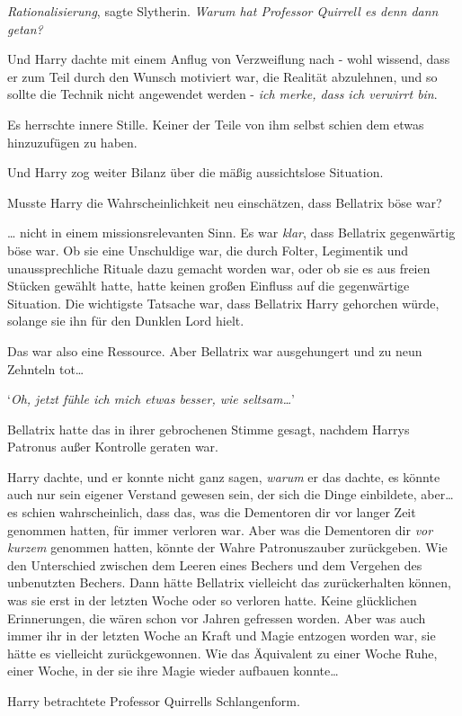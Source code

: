 {\emph{Rationalisierung}, sagte Slytherin. \emph{Warum hat Professor Quirrell es denn dann getan?}

Und Harry dachte mit einem Anflug von Verzweiflung nach - wohl wissend, dass er zum Teil durch den Wunsch motiviert war, die Realität abzulehnen, und so sollte die Technik nicht angewendet werden - \emph{ich merke, dass ich verwirrt bin}.

Es herrschte innere Stille. Keiner der Teile von ihm selbst schien dem etwas hinzuzufügen zu haben.

Und Harry zog weiter Bilanz über die mäßig aussichtslose Situation.

Musste Harry die Wahrscheinlichkeit neu einschätzen, dass Bellatrix böse war?

… nicht in einem missionsrelevanten Sinn. Es war \emph{klar}, dass Bellatrix gegenwärtig böse war. Ob sie eine Unschuldige war, die durch Folter, Legimentik und unaussprechliche Rituale dazu gemacht worden war, oder ob sie es aus freien Stücken gewählt hatte, hatte keinen großen Einfluss auf die gegenwärtige Situation. Die wichtigste Tatsache war, dass Bellatrix Harry gehorchen würde, solange sie ihn für den Dunklen Lord hielt.

Das war also eine Ressource. Aber Bellatrix war ausgehungert und zu neun Zehnteln tot…

`\emph{Oh, jetzt fühle ich mich etwas besser, wie seltsam…}'

Bellatrix hatte das in ihrer gebrochenen Stimme gesagt, nachdem Harrys Patronus außer Kontrolle geraten war.

Harry dachte, und er konnte nicht ganz sagen, \emph{warum} er das dachte, es könnte auch nur sein eigener Verstand gewesen sein, der sich die Dinge einbildete, aber… es schien wahrscheinlich, dass das, was die Dementoren dir vor langer Zeit genommen hatten, für immer verloren war. Aber was die Dementoren dir \emph{vor kurzem} genommen hatten, könnte der Wahre Patronuszauber zurückgeben. Wie den Unterschied zwischen dem Leeren eines Bechers und dem Vergehen des unbenutzten Bechers. Dann hätte Bellatrix vielleicht das zurückerhalten können, was sie erst in der letzten Woche oder so verloren hatte. Keine glücklichen Erinnerungen, die wären schon vor Jahren gefressen worden. Aber was auch immer ihr in der letzten Woche an Kraft und Magie entzogen worden war, sie hätte es vielleicht zurückgewonnen. Wie das Äquivalent zu einer Woche Ruhe, einer Woche, in der sie ihre Magie wieder aufbauen konnte…

Harry betrachtete Professor Quirrells Schlangenform.

}
